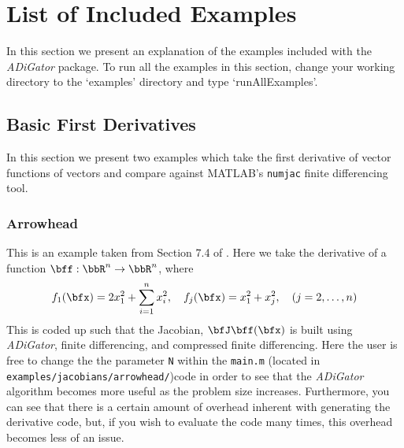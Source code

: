 \documentclass[10pt,pdftex]{article}
\begin{document}
\section{List of Included Examples}
In this section we present an explanation of the examples included with the \emph{ADiGator} package.
To run all the examples in this section, change your working directory to the `examples' directory and type `runAllExamples'.
\subsection{Basic First Derivatives}
In this section we present two examples which take the first derivative of vector functions of vectors and compare against MATLAB's \texttt{numjac} finite differencing tool.
\subsubsection{Arrowhead}
This is an example taken from Section 7.4 of \cite{Griewank1}. Here we take the derivative of a function $\bff: \bbR^n \rightarrow \bbR^n$, where
\begin{equation}
f_1(\bfx) = 2x^2_1+ \sum^n_{i=1}x_i^2, \quad f_j(\bfx) = x_1^2 + x_j^2, \quad (j = 2,\dots,n)
\end{equation}
This is coded up such that the Jacobian, $\bfJ\bff(\bfx)$ is built using \emph{ADiGator}, finite differencing, and compressed finite differencing. Here the user is free to change the the parameter \texttt{N} within the \texttt{main.m} (located in \texttt{examples/jacobians/arrowhead/})code in order to see that the \emph{ADiGator} algorithm becomes more useful as the problem size increases. Furthermore, you can see that there is a certain amount of overhead inherent with generating the derivative code, but, if you wish to evaluate the code many times, this overhead becomes less of an issue.
\end{document}
